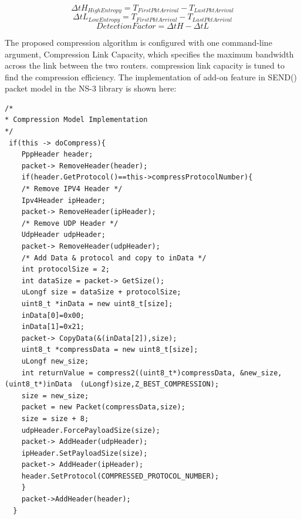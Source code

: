 \documentclass[sigconf]{acmart}
\begin{document}
\begin{displaymath}
	\Delta tH_{HighEntropy}  = T_{FirstPktArrival} - T_{LastPktArrival} 
\end{displaymath}
\begin{displaymath}
	\Delta tL_{LowEntropy}  = T_{FirstPktArrival} - T_{LastPktArrival} 
\end{displaymath}
\begin{equation}
 	DetectionFactor = \Delta tH - \Delta tL
\end{equation}
\label{delta}


The proposed compression algorithm is configured with one command-line argument, Compression Link Capacity, which specifies the maximum bandwidth across the link between the two routers. compression link capacity is tuned to find the compression efficiency. The implementation of add-on feature in SEND() packet model in the NS-3 library is shown here:

 \begin{lstlisting}
/*
* Compression Model Implementation
*/
 if(this -> doCompress){   
    PppHeader header;
    packet-> RemoveHeader(header);
    if(header.GetProtocol()==this->compressProtocolNumber){      
    /* Remove IPV4 Header */
    Ipv4Header ipHeader;
    packet-> RemoveHeader(ipHeader);
    /* Remove UDP Header */
    UdpHeader udpHeader;
    packet-> RemoveHeader(udpHeader);
    /* Add Data & protocol and copy to inData */
    int protocolSize = 2;
    int dataSize = packet-> GetSize();
    uLongf size = dataSize + protocolSize; 
    uint8_t *inData = new uint8_t[size];
    inData[0]=0x00; 
    inData[1]=0x21;
    packet-> CopyData(&(inData[2]),size);
    uint8_t *compressData = new uint8_t[size];
    uLongf new_size;
    int returnValue = compress2((uint8_t*)compressData, &new_size, (uint8_t*)inData  (uLongf)size,Z_BEST_COMPRESSION);     
    size = new_size;
    packet = new Packet(compressData,size); 
    size = size + 8; 
    udpHeader.ForcePayloadSize(size);
    packet-> AddHeader(udpHeader);
    ipHeader.SetPayloadSize(size); 
    packet-> AddHeader(ipHeader);
    header.SetProtocol(COMPRESSED_PROTOCOL_NUMBER); 
    } 
    packet->AddHeader(header);
  } 

\end{lstlisting}
\end{document}
